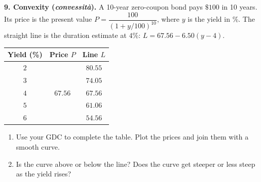 \documentclass[12pt, twoside]{article}
\newcommand{\ita}[1]{(\emph{#1})}
\begin{document}
\textbf{9. Convexity \ita{convessità}.} A 10-year zero-coupon bond pays
$\$100$ in 10 years. Its price is the present value
$P = \dfrac{100}{(1 + y/100)^{10}}$, where $y$ is the yield in \%. The
straight line is the duration estimate at $4\%$:
$L = 67.56 - 6.50(y - 4)$.

\begin{minipage}[t]{0.47\linewidth}
\vspace{0pt}
\renewcommand{\arraystretch}{1.3}
\begin{tabular}{|c|c|c|}
  \hline
  Yield (\%) & Price $P$ & Line $L$ \\ \hline
  $2$ & & $80.55$ \\ \hline
  $3$ & & $74.05$ \\ \hline
  $4$ & $67.56$ & $67.56$ \\ \hline
  $5$ & & $61.06$ \\ \hline
  $6$ & & $54.56$ \\ \hline
\end{tabular}
\end{minipage}
\hfill
\begin{minipage}[t]{0.5\linewidth}
\vspace{0pt}
\end{minipage}

\begin{enumerate}[label=(\alph*), itemsep=0.1cm]
  \item Use your GDC to complete the table. Plot the prices and join them
  with a smooth curve.
  \item Is the curve above or below the line? Does the curve get steeper or
  less steep as the yield rises?
  \vspace{0.9cm}
\end{enumerate}
\end{document}
